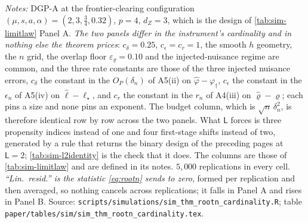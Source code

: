 \documentclass[
  12pt]{article}
\newcommand{\1}[1]{\mathds{1}\left[#1\right]}
\theoremstyle{plain}
\theoremstyle{definition}
\theoremstyle{definition}
\theoremstyle{remark}
\begin{document}
\begin{table}[!htbp]
\centering
\begin{threeparttable}
\caption{The limit law at two instrument cardinalities, on the design of
\cref{tab:sim-limitlaw}}
\label{tab:sim-card}
\footnotesize

\begin{tablenotes}\footnotesize
\item \textit{Notes:} DGP-A at the frontier-clearing configuration
$(\mu,s,a,\alpha)=(2,3,\tfrac34,0.32)$, $p=4$, $d_Z=3$, which is the design of
\cref{tab:sim-limitlaw} Panel A. \emph{The two panels differ in the instrument's
cardinality and in nothing else the theorem prices}: $c_\delta=0.25$,
$c_\epsilon=c_r=1$, the smooth $h$ geometry, the $n$ grid, the overlap floor
$\varepsilon_\varrho=0.10$ and the injected-nuisance regime are common, and the
three rate constants are those of the three injected nuisance errors, $c_\delta$
the constant in the $O_P(\delta_n)$ of A5(ii) on $\hat\varphi-\varphi_\dagger$,
$c_\epsilon$ the constant in the $\epsilon_n$ of A5(iv) on
$\hat\ell-\ell_\star$, and $c_r$ the constant in the $r_n$ of A4(iii) on
$\hat\varrho-\varrho$; each pins a size and none pins an exponent. The
budget column, which is $\sqrt n\,\delta_n^{2}$, is therefore identical row by
row across the two panels. What $\mathsf L$ forces is three propensity indices
instead of one and four first-stage shifts instead of two, generated by a rule
that returns the binary design of the preceding pages at $\mathsf L=2$;
\cref{tab:sim-l2identity} is the check that it does. The columns are those of
\cref{tab:sim-limitlaw} and are defined in its notes. $5{,}000$ replications in
every cell. \emph{``Lin.\ resid.'' is the statistic \eqref{eq:rootn} sends to
zero}, formed per replication and then averaged, so nothing cancels across
replications; it falls in Panel A and rises in Panel B. Source:
\texttt{scripts/simulations/sim\_thm\_rootn\_cardinality.R}; table
\texttt{paper/tables/sim/sim\_thm\_rootn\_cardinality.tex}.
\end{tablenotes}
\end{threeparttable}
\end{table}
\end{document}
